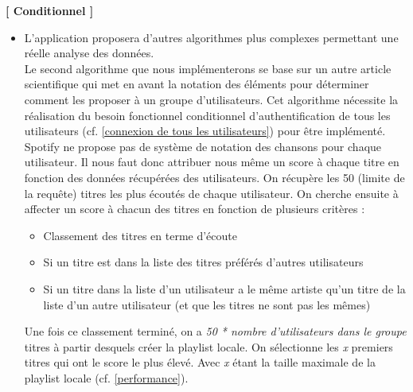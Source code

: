 \documentclass{article}
\begin{document}
		\newpage
		\textbf{[ Conditionnel ]}
		\begin{itemize}
			\item  L'application proposera d'autres algorithmes \cite{ICDM2017} plus complexes permettant une réelle analyse des données. \newline \\
			      Le second algorithme que nous implémenterons se base sur un autre article scientifique \cite{Masthof2011} qui met en avant la notation des éléments pour déterminer comment les proposer à un groupe d'utilisateurs. Cet algorithme nécessite la réalisation du besoin fonctionnel conditionnel d'authentification de tous les utilisateurs (cf. \ref{connexion de tous les utilisateurs}) pour être implémenté. \newline
			      Spotify ne propose pas de système de notation des chansons pour chaque utilisateur. Il nous faut donc attribuer nous même un score à chaque titre en fonction des données récupérées des utilisateurs. On récupère les 50 (limite de la requête) titres les plus écoutés de chaque utilisateur. On cherche ensuite à affecter un score à chacun des titres en fonction de plusieurs critères : 
			      \begin{itemize}
			      	\item Classement des titres en terme d'écoute
			      	\item Si un titre est dans la liste des titres préférés d'autres utilisateurs
			      	\item Si un titre dans la liste d'un utilisateur a le même artiste qu'un titre de la liste d'un autre utilisateur (et que les titres ne sont pas les mêmes)
			      \end{itemize}
			      Une fois ce classement terminé, on a \textit{50 * nombre d'utilisateurs dans le groupe} titres à partir desquels créer la playlist locale. On sélectionne les \textit{x} premiers titres qui ont le score le plus élevé. Avec \textit{x} étant la taille maximale de la playlist locale (cf. \ref{performance}).
		\end{itemize}
		\newpage
\end{document}
